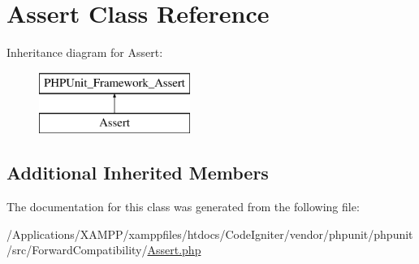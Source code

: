 \hypertarget{class_p_h_p_unit_1_1_framework_1_1_assert}{}\section{Assert Class Reference}
\label{class_p_h_p_unit_1_1_framework_1_1_assert}
Inheritance diagram for Assert\+:\begin{figure}[H]
\begin{center}
\leavevmode
\includegraphics[height=2.000000cm]{class_p_h_p_unit_1_1_framework_1_1_assert}
\end{center}
\end{figure}
\subsection*{Additional Inherited Members}


The documentation for this class was generated from the following file\+:\begin{DoxyCompactItemize}
\item 
/\+Applications/\+X\+A\+M\+P\+P/xamppfiles/htdocs/\+Code\+Igniter/vendor/phpunit/phpunit/src/\+Forward\+Compatibility/\mbox{\hyperlink{phpunit_2phpunit_2src_2_forward_compatibility_2_assert_8php}{Assert.\+php}}\end{DoxyCompactItemize}

